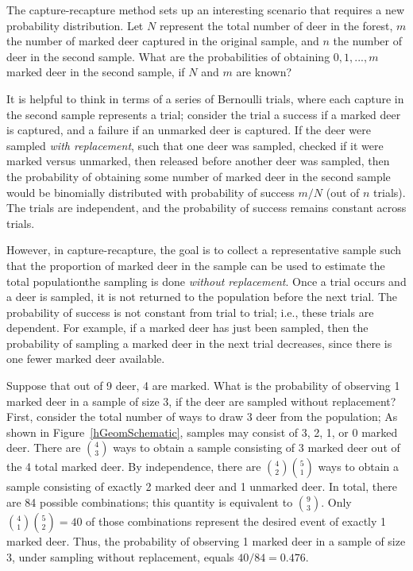 The capture-recapture method sets up an interesting scenario that requires a new probability distribution. Let $N$ represent the total number of deer in the forest, $m$ the number of marked deer captured in the original sample, and $n$ the number of deer in the second sample. What are the probabilities of obtaining $0, 1, ... , m$ marked deer in the second sample, if $N$ and $m$ are known?

It is helpful to think in terms of a series of Bernoulli trials, where each capture in the second sample represents a trial; consider the trial a success if a marked deer is captured, and a failure if an unmarked deer is captured. If the deer were sampled \textit{with replacement}, such that one deer was sampled, checked if it were marked versus unmarked, then released before another deer was sampled, then the probability of obtaining some number of marked deer in the second sample would be binomially distributed with probability of success $m/N$ (out of $n$ trials). The trials are independent, and the probability of success remains constant across trials.

However, in capture-recapture, the goal is to collect a representative sample such that the proportion of marked deer in the sample can be used to estimate the total population\textemdash the sampling is done \textit{without replacement}. Once a trial occurs and a deer is sampled, it is not returned to the population before the next trial. The probability of success is not constant from trial to trial; i.e., these trials are dependent. For example, if a marked deer has just been sampled, then the probability of sampling a marked deer in the next trial decreases, since there is one fewer marked deer available. 

Suppose that out of 9 deer, 4 are marked. What is the probability of observing 1 marked deer in a sample of size 3, if the deer are sampled without replacement? First, consider the total number of ways to draw 3 deer from the population; As shown in Figure~\ref{hGeomSchematic}, samples may consist of 3, 2, 1, or 0 marked deer. There are ${4 \choose 3}$ ways to obtain a sample consisting of 3 marked deer out of the 4 total marked deer. By independence, there are ${4 \choose 2} {5 \choose 1}$ ways to obtain a sample consisting of exactly 2 marked deer and 1 unmarked deer. In total, there are 84 possible combinations; this quantity is equivalent to ${9 \choose 3}$. Only ${4 \choose 1} {5 \choose 2} = 40$ of those combinations represent the desired event of exactly 1 marked deer. Thus, the probability of observing 1 marked deer in a sample of size 3, under sampling without replacement, equals $40/84 = 0.476$.

